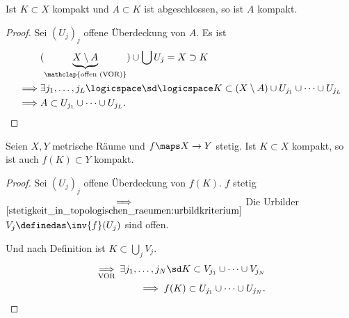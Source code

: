 \begin{lemma}
    Ist \( K\subset X\) kompakt und \( A\subset K\) ist abgeschlossen, so ist \( A\) kompakt.
\end{lemma}
\begin{proof}
    Sei \( (U_j)_j\) offene Überdeckung von \( A\). Es ist
    \begin{align*}
        &(\underbrace{X\setminus A}_{\mathclap{\text{offen (VOR)}}})\cup \bigcup U_j=X\supset K\\
        \implies &\exists j_1,\ldots, j_L\logicspace \sd\logicspace K\subset (X\setminus A)\cup U_{j_1}\cup \cdots \cup U_{j_L}\\
        \implies &A\subset U_{j_1}\cup \cdots \cup U_{j_L}.  
    \end{align*}
    
\end{proof}


\begin{satz}\label{kompakte_menge_stetiges_bild_kompakt}
    Seien \( X,Y\) metrische Räume und \( f\maps X\to Y\) stetig. Ist \( K\subset X\) kompakt, so ist auch \( f(K)\subset Y\) kompakt. 
\end{satz}
\begin{proof}
    Sei \( (U_j)_j\) offene Überdeckung von \( f(K)\). \( f\) stetig \( \underset{\ref{stetigkeit_in_topologischen_raeumen:urbildkriterium}}{\implies}\) Die Urbilder \( V_j \definedas \inv{f}(U_j)\) sind offen.
    
    Und nach Definition ist \( K\subset \bigcup_j V_j\).
    \begin{align*}
        \underset{\text{VOR}}{\implies} \exists j_1,\ldots, j_N\sd K\subset V_{j_1}\cup \cdots \cup V_{j_N}\\
        \implies f(K)\subset U_{j_1}\cup \cdots\cup U_{j_N}.
    \end{align*} 
    
\end{proof}

